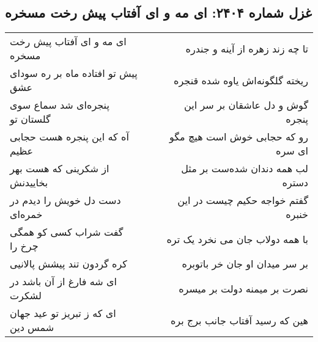 \begin{center}
\section*{غزل شماره ۲۴۰۴: ای مه و ای آفتاب پیش رخت مسخره}
\label{sec:2404}
\begin{longtable}{l p{0.5cm} r}
ای مه و ای آفتاب پیش رخت مسخره
&&
تا چه زند زهره از آینه و جندره
\\
پیش تو افتاده ماه بر ره سودای عشق
&&
ریخته گلگونه‌اش یاوه شده قنجره
\\
پنجره‌ای شد سماع سوی گلستان تو
&&
گوش و دل عاشقان بر سر این پنجره
\\
آه که این پنجره هست حجابی عظیم
&&
رو که حجابی خوش است هیچ مگو ای سره
\\
از شکرینی که هست بهر بخاییدنش
&&
لب همه دندان شده‌ست بر مثل دستره
\\
دست دل خویش را دیدم در خمره‌ای
&&
گفتم خواجه حکیم چیست در این خنبره
\\
گفت شراب کسی کو همگی چرخ را
&&
با همه دولاب جان می نخرد یک تره
\\
کره گردون تند پیشش پالانیی
&&
بر سر میدان او جان خر باتوبره
\\
ای شه فارغ از آن باشد در لشکرت
&&
نصرت بر میمنه دولت بر میسره
\\
ای که ز تبریز تو عید جهان شمس دین
&&
هین که رسید آفتاب جانب برج بره
\\
\end{longtable}
\end{center}
